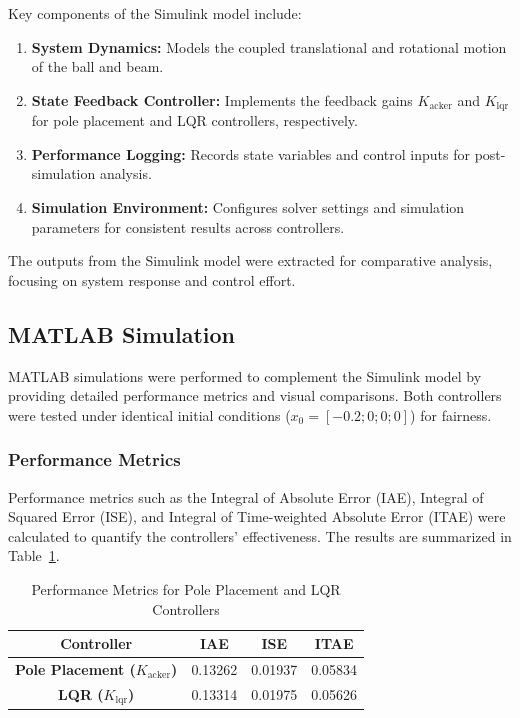 \documentclass[conference]{IEEEtran}
\begin{document}
Key components of the Simulink model include:
\begin{enumerate}
    \item \textbf{System Dynamics:} Models the coupled translational and rotational motion of the ball and beam.
    \item \textbf{State Feedback Controller:} Implements the feedback gains \(K_{\text{acker}}\) and \(K_{\text{lqr}}\) for pole placement and LQR controllers, respectively.
    \item \textbf{Performance Logging:} Records state variables and control inputs for post-simulation analysis.
    \item \textbf{Simulation Environment:} Configures solver settings and simulation parameters for consistent results across controllers.
\end{enumerate}

The outputs from the Simulink model were extracted for comparative analysis, focusing on system response and control effort.

\subsection{MATLAB Simulation}
\label{subsec:matlab_simulation}

MATLAB simulations were performed to complement the Simulink model by providing detailed performance metrics and visual comparisons. Both controllers were tested under identical initial conditions (\(x_0 = [-0.2; 0; 0; 0]\)) for fairness.

\subsubsection{Performance Metrics}

Performance metrics such as the Integral of Absolute Error (IAE), Integral of Squared Error (ISE), and Integral of Time-weighted Absolute Error (ITAE) were calculated to quantify the controllers' effectiveness. The results are summarized in Table~\ref{tab:performance_metrics}.

\begin{table}[H]
\caption{Performance Metrics for Pole Placement and LQR Controllers}
\label{tab:performance_metrics}
\centering
\begin{tabular}{|c|c|c|c|}
\hline
\textbf{Controller} & \textbf{IAE} & \textbf{ISE} & \textbf{ITAE} \\ \hline
\textbf{Pole Placement (\(K_{\text{acker}}\))} & 0.13262 & 0.01937 & 0.05834 \\ \hline
\textbf{LQR (\(K_{\text{lqr}}\))}             & 0.13314 & 0.01975 & 0.05626 \\ \hline
\end{tabular}
\end{table}
\end{document}
